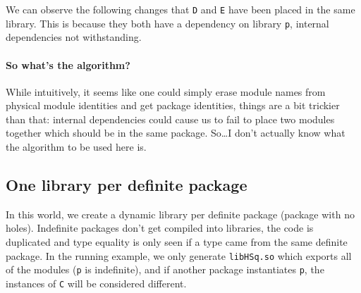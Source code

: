 \documentclass{article}
\begin{document}

We can observe the following changes that \verb|D| and \verb|E| have
been placed in the same library.  This is because they both have a
dependency on library \verb|p|, internal dependencies not withstanding.

\paragraph{So what's the algorithm?}  While intuitively, it seems like
one could simply erase module names from physical module identities and
get package identities, things are a bit trickier than that: internal
dependencies could cause us to fail to place two modules together which
should be in the same package.  So\ldots I don't actually know what the
algorithm to be used here is.

\subsection{One library per definite package}

In this world, we create a dynamic library per definite package (package with
no holes).  Indefinite packages don't get compiled into libraries, the code
is duplicated and type equality is only seen if a type came from the same
definite package.  In the running example, we only generate \verb|libHSq.so|
which exports all of the modules (\verb|p| is indefinite), and if another
package instantiates \verb|p|, the instances of \verb|C| will be considered
different. \\

\end{document}
